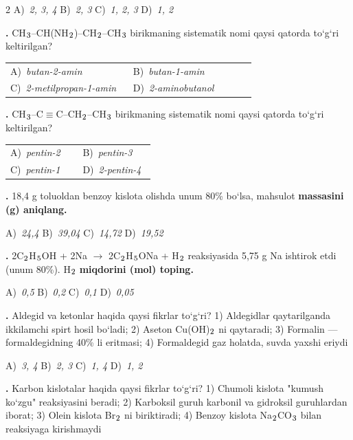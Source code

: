 \documentclass[11pt,a4paper]{article}
\renewcommand{\textsubscript}[1]{\ensuremath{_{\text{\fontsize{8}{8}\selectfont #1}}}}
\newcommand{\qn}[1]{\textbf{\fontsize{11.5}{13}\selectfont #1}}
\newcommand{\qsep}{\par\vspace{1pt}\noindent\rule{0pt}{0.4pt}\par\vspace{5pt}}
\begin{document}
\begin{multicols}{2}
\noindent A)~\textsl{2, 3, 4} \hfill B)~\textsl{2, 3} \hfill C)~\textsl{1, 2, 3} \hfill D)~\textsl{1, 2}\par
\qsep
\noindent\qn{20.} CH\textsubscript{3}--CH(NH\textsubscript{2})--CH\textsubscript{2}--CH\textsubscript{3} birikmaning sistematik nomi qaysi qatorda to`g`ri keltirilgan?

\noindent\begin{tabular}{@{}p{0.47\linewidth}@{}p{0.47\linewidth}@{}}
A)~\textsl{butan-2-amin} & B)~\textsl{butan-1-amin} \\
C)~\textsl{2-metilpropan-1-amin} & D)~\textsl{2-aminobutanol} \\
\end{tabular}\par
\qsep
\noindent\qn{21.} CH\textsubscript{3}--C$\equiv$C--CH\textsubscript{2}--CH\textsubscript{3} birikmaning sistematik nomi qaysi qatorda to`g`ri keltirilgan?

\noindent\begin{tabular}{@{}p{0.47\linewidth}@{}p{0.47\linewidth}@{}}
A)~\textsl{pentin-2} & B)~\textsl{pentin-3} \\
C)~\textsl{pentin-1} & D)~\textsl{2-pentin-4} \\
\end{tabular}\par
\qsep
\noindent\qn{22.} 18,4 g toluoldan benzoy kislota olishda unum 80\% bo`lsa, mahsulot \textbf{massasini (g) aniqlang.}

\noindent A)~\textsl{24,4} \hfill B)~\textsl{39,04} \hfill C)~\textsl{14,72} \hfill D)~\textsl{19,52}\par
\qsep
\noindent\qn{23.} 2C\textsubscript{2}H\textsubscript{5}OH + 2Na $\to$ 2C\textsubscript{2}H\textsubscript{5}ONa + H\textsubscript{2} reaksiyasida 5,75 g Na ishtirok etdi (unum 80\%). H\textsubscript{2} \textbf{miqdorini (mol) toping.}

\noindent A)~\textsl{0,5} \hfill B)~\textsl{0,2} \hfill C)~\textsl{0,1} \hfill D)~\textsl{0,05}\par
\qsep
\noindent\qn{24.} Aldegid va ketonlar haqida qaysi fikrlar to`g`ri? 1) Aldegidlar qaytarilganda ikkilamchi spirt hosil bo`ladi; 2) Aseton Cu(OH)\textsubscript{2} ni qaytaradi; 3) Formalin --- formaldegidning 40\% li eritmasi; 4) Formaldegid gaz holatda, suvda yaxshi eriydi

\noindent A)~\textsl{3, 4} \hfill B)~\textsl{2, 3} \hfill C)~\textsl{1, 4} \hfill D)~\textsl{1, 2}\par
\qsep
\noindent\qn{25.} Karbon kislotalar haqida qaysi fikrlar to`g`ri? 1) Chumoli kislota "kumush ko`zgu" reaksiyasini beradi; 2) Karboksil guruh karbonil va gidroksil guruhlardan iborat; 3) Olein kislota Br\textsubscript{2} ni biriktiradi; 4) Benzoy kislota Na\textsubscript{2}CO\textsubscript{3} bilan reaksiyaga kirishmaydi


\end{multicols}
\end{document}
